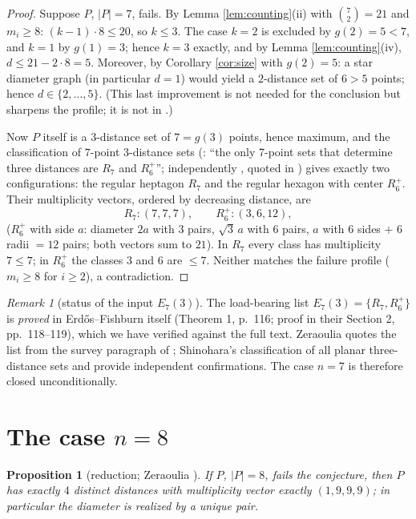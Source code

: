 \documentclass[11pt]{article}
\newtheorem{proposition}[theorem]{Proposition}
\theoremstyle{definition}
\theoremstyle{remark}
\newtheorem{remark}[theorem]{Remark}
\begin{document}
\begin{proof}
Suppose $P$, $|P| = 7$, fails. By Lemma \ref{lem:counting}(ii) with $\binom{7}{2} = 21$
and $m_i \ge 8$: $(k-1) \cdot 8 \le 20$, so $k \le 3$. The case $k = 2$ is excluded by
$g(2) = 5 < 7$, and $k = 1$ by $g(1) = 3$; hence $k = 3$ exactly, and by Lemma
\ref{lem:counting}(iv), $d \le 21 - 2 \cdot 8 = 5$. Moreover, by Corollary \ref{cor:size}
with $g(2) = 5$: a star diameter graph (in particular $d = 1$) would yield a $2$-distance
set of $6 > 5$ points; hence $d \in \{2, \dots, 5\}$. (This last improvement is not needed
for the conclusion but sharpens the profile; it is not in \cite{Zeraoulia26}.)

Now $P$ itself is a $3$-distance set of $7 = g(3)$ points, hence maximum, and the
classification of $7$-point $3$-distance sets (\cite[Theorem~1]{ErFi96}: ``the only
7-point sets that determine three distances are $R_7$ and $R_6^+$''; independently
\cite{Shinohara04}, quoted in \cite[\S1]{Wei12}) gives exactly two configurations: the
regular heptagon $R_7$ and the regular hexagon with center $R_6^+$. Their multiplicity
vectors, ordered by decreasing distance, are
\[
R_7 : (7, 7, 7), \qquad R_6^+ : (3, 6, 12),
\]
($R_6^+$ with side $a$: diameter $2a$ with $3$ pairs, $\sqrt{3}\,a$ with $6$ pairs, $a$
with $6$ sides $+$ $6$ radii $= 12$ pairs; both vectors sum to $21$). In $R_7$ every class
has multiplicity $7 \le 7$; in $R_6^+$ the classes $3$ and $6$ are $\le 7$. Neither
matches the failure profile ($m_i \ge 8$ for $i \ge 2$), a contradiction.
\end{proof}

\begin{remark}[status of the input $E_7(3)$]\label{rem:E73}
The load-bearing list $E_7(3) = \{R_7, R_6^+\}$ is \emph{proved} in Erd\H{o}s--Fishburn
\cite{ErFi96} itself (Theorem 1, p.~116; proof in their Section 2, pp.~118--119), which
we have verified against the full text. Zeraoulia quotes the list from the survey
paragraph of \cite[\S1]{Wei12}; Shinohara's classification of all planar three-distance
sets \cite{Shinohara04} and \cite[Lemma~2.2(b)]{Shinohara08} provide independent
confirmations. The case $n = 7$ is therefore closed unconditionally.
\end{remark}

\section{The case $n = 8$}\label{sec:n8}

\begin{proposition}[reduction; {Zeraoulia \cite{Zeraoulia26}}]\label{prop:n8red}
If $P$, $|P| = 8$, fails the conjecture, then $P$ has exactly $4$ distinct distances with
multiplicity vector exactly $(1, 9, 9, 9)$; in particular the diameter is realized by a
unique pair.
\end{proposition}
\end{document}
